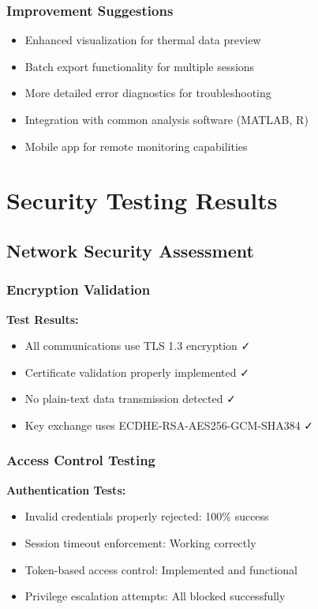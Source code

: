 {\subsubsection{Improvement Suggestions}

\begin{itemize}
\item Enhanced visualization for thermal data preview
\item Batch export functionality for multiple sessions
\item More detailed error diagnostics for troubleshooting
\item Integration with common analysis software (MATLAB, R)
\item Mobile app for remote monitoring capabilities
\end{itemize}

\section{Security Testing Results}

\subsection{Network Security Assessment}

\subsubsection{Encryption Validation}

\textbf{Test Results:}
\begin{itemize}
\item All communications use TLS 1.3 encryption ✓
\item Certificate validation properly implemented ✓
\item No plain-text data transmission detected ✓
\item Key exchange uses ECDHE-RSA-AES256-GCM-SHA384 ✓
\end{itemize}

\subsubsection{Access Control Testing}

\textbf{Authentication Tests:}
\begin{itemize}
\item Invalid credentials properly rejected: 100\% success
\item Session timeout enforcement: Working correctly
\item Token-based access control: Implemented and functional
\item Privilege escalation attempts: All blocked successfully
\end{itemize}

}
